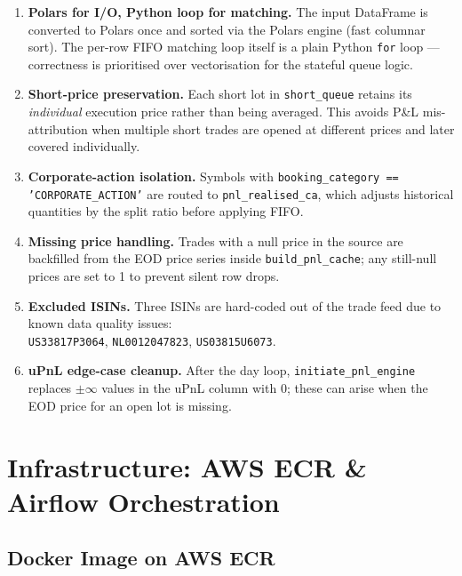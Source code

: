\documentclass[11pt, a4paper]{article}
\begin{document}
\begin{enumerate}

  \item \textbf{Polars for I/O, Python loop for matching.}
    The input DataFrame is converted to Polars once and sorted via
    the Polars engine (fast columnar sort).  The per-row FIFO
    matching loop itself is a plain Python \texttt{for} loop —
    correctness is prioritised over vectorisation for the stateful
    queue logic.

  \item \textbf{Short-price preservation.}
    Each short lot in \texttt{short\_queue} retains its
    \emph{individual} execution price rather than being
    averaged.  This avoids P\&L mis-attribution when multiple
    short trades are opened at different prices and later covered
    individually.

  \item \textbf{Corporate-action isolation.}
    Symbols with \texttt{booking\_category == 'CORPORATE\_ACTION'}
    are routed to \texttt{pnl\_realised\_ca}, which adjusts
    historical quantities by the split ratio before applying FIFO.

  \item \textbf{Missing price handling.}
    Trades with a null price in the source are backfilled from the
    EOD price series inside \texttt{build\_pnl\_cache}; any
    still-null prices are set to 1 to prevent silent row drops.

  \item \textbf{Excluded ISINs.}
    Three ISINs are hard-coded out of the trade feed due to known
    data quality issues:\\
    \texttt{US33817P3064}, \texttt{NL0012047823}, \texttt{US03815U6073}.

  \item \textbf{uPnL edge-case cleanup.}
    After the day loop, \texttt{initiate\_pnl\_engine} replaces
    $\pm\infty$ values in the uPnL column with 0; these can arise
    when the EOD price for an open lot is missing.

\end{enumerate}

\section{Infrastructure: AWS ECR \& Airflow Orchestration}

\subsection{Docker Image on AWS ECR}
\end{document}
